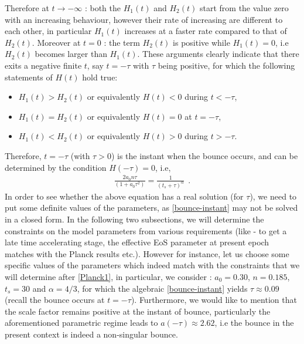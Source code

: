 \documentclass{article}
\begin{document}
Therefore at $t \rightarrow -\infty$ : both the $H_1(t)$ and $H_2(t)$ start from the value zero with an increasing behaviour, however their rate 
of increasing are different to each other, in particular $H_1(t)$ increases at a faster rate compared to that of $H_2(t)$. Moreover 
at $t = 0$ : the term $H_2(t)$ is positive while $H_1(t) = 0$, i.e $H_2(t)$ becomes larger than $H_1(t)$. These arguments clearly indicate that there 
exits a negative finite $t$, say $t = -\tau$ with $\tau$ being positive, for which the following statements of $H(t)$ hold true:
\begin{itemize}
 \item $H_1(t) > H_2(t)$ or equivalently $H(t) < 0$ during $t < -\tau$,
 
 \item $H_1(t) = H_2(t)$ or equivalently $H(t) = 0$ at $t = -\tau$,
 
 \item $H_1(t) < H_2(t)$ or equivalently $H(t) > 0$ during $t > -\tau$.
\end{itemize}
Therefore, $t = -\tau$ (with $\tau > 0$) is the instant when the bounce occurs, and can be determined by the condition $H(-\tau) = 0$, i.e,
\begin{eqnarray}
 \frac{2a_0n\tau}{\left(1 + a_0\tau^2\right)} = \frac{1}{\left(t_s + \tau\right)^{\alpha}}~~.
 \label{bounce-instant}
\end{eqnarray}
In order to see whether the above equation has a real solution (for $\tau$), we need to put some definite values of the parameters, as \ref{bounce-instant} 
may not be solved in a closed form. In the following two subsections, we will determine the constraints on the model parameters from various requirements 
(like - to get a late time accelerating stage, the effective EoS parameter 
at present epoch matches with the Planck results \cite{Aghanim:2018eyx} etc.). However for instance, let us choose some 
specific values of the parameters which indeed match with the constraints that we will determine after \ref{Planck1}, 
in particular, we consider : $a_0 = 0.30$, 
$n = 0.185$, $t_s = 30$ and $\alpha = 4/3$, for which the algebraic \ref{bounce-instant} yields $\tau \approx 0.09$ (recall the bounce occurs at 
$t = -\tau$). Furthermore, we would like to mention that the scale factor remains positive at the instant of bounce, 
particularly the aforementioned parametric regime leads to  $a(-\tau) \approx 2.62$, i.e the bounce in the present context 
is indeed a non-singular bounce.\\
\end{document}
